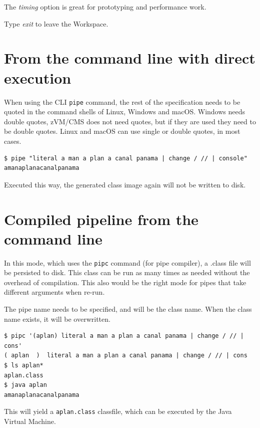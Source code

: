 The \emph{timing} option is great for prototyping and performance work.

Type \emph{exit} to leave the \nr{} Workspace.

\section{From the command line with direct execution} 
When using the CLI \texttt{pipe} command,
the rest of the specification needs to be quoted in the command shells
of Linux, Windows and macOS. Windows needs double quotes, zVM/CMS does not need quotes,
but if they are used they need to be double quotes. Linux and macOS
can use single or double quotes, in most cases.
\begin{lstlisting}
$ pipe "literal a man a plan a canal panama | change / // | console"
amanaplanacanalpanama
\end{lstlisting}
Executed this way, the generated class image again will not be written to
disk.


\section{Compiled pipeline from the command line}
In this mode, which uses the \texttt{pipc} command (for pipe
compiler), a .class file will be persisted to disk. This class can be
run as many times as needed without the overhead of compilation. This
also would be the right mode for pipes that take different arguments when re-run.

The pipe name needs to be specified, and will be the class name. When
the class name exists, it will be overwritten.
\begin{lstlisting}
$ pipc '(aplan) literal a man a plan a canal panama | change / // | cons'
( aplan  )  literal a man a plan a canal panama | change / // | cons
$ ls aplan*
aplan.class
$ java aplan
amanaplanacanalpanama
\end{lstlisting}
This will yield a \texttt{aplan.class} classfile, which
can be executed by the Java Virtual Machine.

